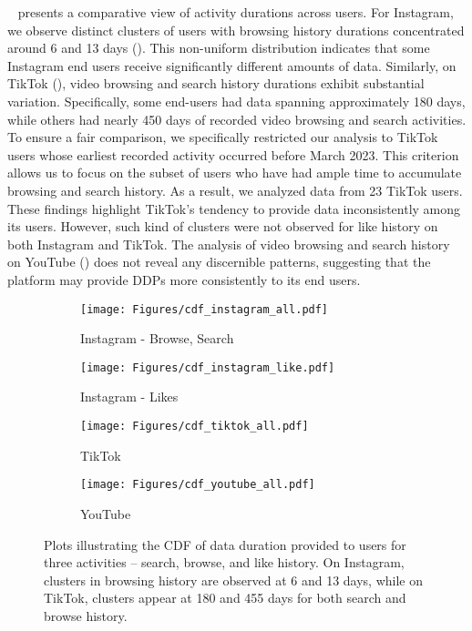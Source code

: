 ~ presents a comparative view of activity durations across users.
For Instagram, we observe distinct clusters of users with browsing history durations concentrated around 6 and 13 days ().
This non-uniform distribution indicates that some Instagram end users receive significantly different amounts of data.
Similarly, on TikTok (), video browsing and search history durations exhibit substantial variation.
Specifically, some end-users had data spanning approximately 180 days, while others had nearly 450 days of recorded video browsing and search activities.
To ensure a fair comparison, we specifically restricted our analysis to TikTok users whose earliest recorded activity occurred before March 2023.
This criterion allows us to focus on the subset of users who have had ample time to accumulate browsing and search history.
As a result, we analyzed data from 23 TikTok users.
These findings highlight TikTok's tendency to provide data inconsistently among its users.
However, such kind of clusters were not observed for like history on both Instagram and TikTok.
The analysis of video browsing and search history on YouTube () does not reveal any discernible patterns, suggesting that the platform may provide DDPs more consistently to its end users.\\
\begin{figure}[t] %
    \centering
    
    \hfill
    \begin{subfigure}[t]{0.49\columnwidth}
        \centering
        \texttt{[image: Figures/cdf\_instagram\_all.pdf]}
        \caption{Instagram - Browse, Search}
        \label{fig:insta_cdf_browse}
    \end{subfigure}
    \begin{subfigure}[t]{0.49\columnwidth}
        \centering
        \texttt{[image: Figures/cdf\_instagram\_like.pdf]}
         \caption{Instagram - Likes}
        \label{fig:insta_cdf_like}
    \end{subfigure}
    \begin{subfigure}[t]{0.49\columnwidth}
        \centering
        \texttt{[image: Figures/cdf\_tiktok\_all.pdf]}
         \caption{TikTok}
        \label{fig:tiktok_cdf_browse}
    \end{subfigure}
    \hfill
    \begin{subfigure}[t]{0.49\columnwidth}
        \centering
        \texttt{[image: Figures/cdf\_youtube\_all.pdf]}
         \caption{YouTube}
        \label{fig:youtube_cdf_browse}
    \end{subfigure}

    \caption{Plots illustrating the CDF of data duration provided to users for three activities -- search, browse, and like history. On Instagram, clusters in browsing history are observed at 6 and 13 days, while on TikTok, clusters appear at 180 and 455 days for both search and browse history.}

    \label{browse_search_overall}
\end{figure}
